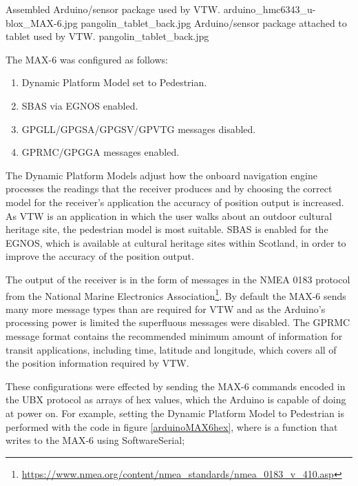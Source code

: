  {Assembled Arduino/sensor package used by VTW.} {arduino_hmc6343_u-blox_MAX-6.jpg}
       {pangolin_tablet_back.jpg} {Arduino/sensor package attached to tablet used by VTW.} {pangolin_tablet_back.jpg}
       

The MAX-6 was configured as follows:

\begin{enumerate}
	\item Dynamic Platform Model set to Pedestrian.
	\item SBAS via EGNOS enabled.
	\item GPGLL/GPGSA/GPGSV/GPVTG messages disabled.
	\item GPRMC/GPGGA messages enabled.
\end{enumerate}

The Dynamic Platform Models adjust how the onboard navigation engine processes the readings that the receiver produces and by choosing the correct model for the receiver's application the accuracy of position output is increased. As VTW is an application in which the user walks about an outdoor cultural heritage site, the pedestrian model is most suitable. SBAS is enabled for the EGNOS, which is available at cultural heritage sites within Scotland, in order to improve the accuracy of the position output.

The output of the receiver is in the form of messages in the NMEA 0183 protocol from the National Marine Electronics Association\footnote{\url{https://www.nmea.org/content/nmea_standards/nmea_0183_v_410.asp}}. By default the MAX-6 sends many more message types than are required for VTW and as the Arduino's processing power is limited the superfluous messages were disabled. The GPRMC message format contains the recommended minimum amount of information for transit applications, including time, latitude and longitude, which covers all of the position information required by VTW.

These configurations were effected by sending the MAX-6 commands encoded in the UBX protocol as arrays of hex values, which the Arduino is capable of doing at power on. For example, setting the Dynamic Platform Model to Pedestrian is performed with the code in figure \ref{arduinoMAX6hex}, where  is a function that writes to the MAX-6 using SoftwareSerial;


